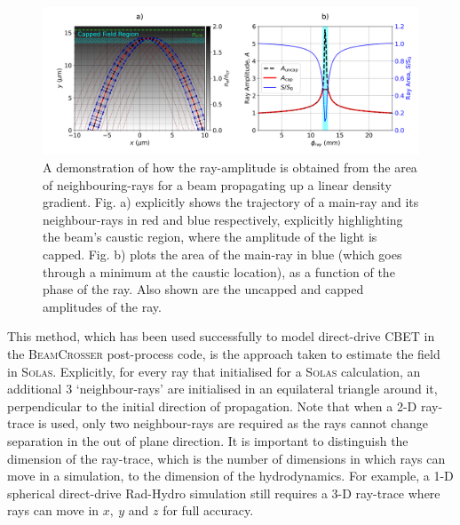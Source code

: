 \begin{figure}[t!]
    \includegraphics[width=\linewidth]{Numerics/Images/FieldCap_Diagram.png}
    \centering
    \caption{A demonstration of how the ray-amplitude is obtained from the area of neighbouring-rays for a beam propagating up a linear density gradient.
    Fig. a) explicitly shows the trajectory of a main-ray and its neighbour-rays in red and blue respectively, explicitly highlighting the beam's caustic region, where the amplitude of the light is capped.
    Fig. b) plots the area of the main-ray in blue (which goes through a minimum at the caustic location), as a function of the phase of the ray.
    Also shown are the uncapped and capped amplitudes of the ray.}%
    \label{fig:SOLAS_fieldcap_diagram}
\end{figure}

This method, which has been used successfully to model direct-drive \ac{CBET} in the \textsc{BeamCrosser} post-process code, is the approach taken to estimate the field in \textsc{Solas}.
Explicitly, for every ray that initialised for a \textsc{Solas} calculation, an additional 3 `neighbour-rays' are initialised in an equilateral triangle around it, perpendicular to the initial direction of propagation.
Note that when a 2-D ray-trace is used, only two neighbour-rays are required as the rays cannot change separation in the out of plane direction.
It is important to distinguish the dimension of the ray-trace, which is the number of dimensions in which rays can move in a simulation, to the dimension of the hydrodynamics.
For example, a 1-D spherical direct-drive \ac{Rad-Hydro} simulation still requires a 3-D ray-trace where rays can move in $x,\ y$ and $z$ for full accuracy.

